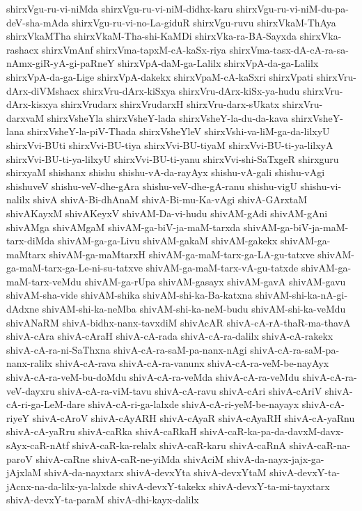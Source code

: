 {shirxVgu-ru-vi-niMda
shirxVgu-ru-vi-niM-didhx-karu
shirxVgu-ru-vi-niM-du-pa-deV-sha-mAda
shirxVgu-ru-vi-no-La-giduR
shirxVgu-ruvu
shirxVkaM-ThAya
shirxVkaMTha
shirxVkaM-Tha-shi-KaMDi
shirxVka-ra-BA-Sayxda
shirxVka-rashacx
shirxVmAnf
shirxVma-tapxM-cA-kaSx-riya
shirxVma-tasx-dA-cA-ra-sa-nAmx-giR-yA-gi-paRneY
shirxVpA-daM-ga-Lalilx
shirxVpA-da-ga-Lalilx
shirxVpA-da-ga-Lige
shirxVpA-dakekx
shirxVpaM-cA-kaSxri
shirxVpati
shirxVru-dArx-diVMshacx
shirxVru-dArx-kiSxya
shirxVru-dArx-kiSx-ya-hudu
shirxVru-dArx-kisxya
shirxVrudarx
shirxVrudarxH
shirxVru-darx-sUkatx
shirxVru-darxvaM
shirxVsheYla
shirxVsheY-lada
shirxVsheY-la-du-da-kava
shirxVsheY-lana
shirxVsheY-la-piV-Thada
shirxVsheYleV
shirxVshi-va-liM-ga-da-lilxyU
shirxVvi-BUti
shirxVvi-BU-tiya
shirxVvi-BU-tiyaM
shirxVvi-BU-ti-ya-lilxyA
shirxVvi-BU-ti-ya-lilxyU
shirxVvi-BU-ti-yanu
shirxVvi-shi-SaTxgeR
shirxguru
shirxyaM
shishanx
shishu
shishu-vA-da-rayAyx
shishu-vA-gali
shishu-vAgi
shishuveV
shishu-veV-dhe-gAra
shishu-veV-dhe-gA-ranu
shishu-vigU
shishu-vi-nalilx
shivA
shivA-Bi-dhAnaM
shivA-Bi-mu-Ka-vAgi
shivA-GArxtaM
shivAKayxM
shivAKeyxV
shivAM-Da-vi-hudu
shivAM-gAdi
shivAM-gAni
shivAMga
shivAMgaM
shivAM-ga-biV-ja-maM-tarxda
shivAM-ga-biV-ja-maM-tarx-diMda
shivAM-ga-ga-Livu
shivAM-gakaM
shivAM-gakekx
shivAM-ga-maMtarx
shivAM-ga-maMtarxH
shivAM-ga-maM-tarx-ga-LA-gu-tatxve
shivAM-ga-maM-tarx-ga-Le-ni-su-tatxve
shivAM-ga-maM-tarx-vA-gu-tatxde
shivAM-ga-maM-tarx-veMdu
shivAM-ga-rUpa
shivAM-gasayx
shivAM-gavA
shivAM-gavu
shivAM-sha-vide
shivAM-shika
shivAM-shi-ka-Ba-katxna
shivAM-shi-ka-nA-gi-dAdxne
shivAM-shi-ka-neMba
shivAM-shi-ka-neM-budu
shivAM-shi-ka-veMdu
shivANaRM
shivA-bidhx-nanx-tavxdiM
shivAcAR
shivA-cA-rA-thaR-ma-thavA
shivA-cAra
shivA-cAraH
shivA-cA-rada
shivA-cA-ra-dalilx
shivA-cA-rakekx
shivA-cA-ra-ni-SaThxna
shivA-cA-ra-saM-pa-nanx-nAgi
shivA-cA-ra-saM-pa-nanx-ralilx
shivA-cA-rava
shivA-cA-ra-vanunx
shivA-cA-ra-veM-be-nayAyx
shivA-cA-ra-veM-bu-doMdu
shivA-cA-ra-veMda
shivA-cA-ra-veMdu
shivA-cA-ra-veV-dayxru
shivA-cA-ra-viM-tavu
shivA-cA-ravu
shivA-cAri
shivA-cAriV
shivA-cA-ri-ga-LeM-dare
shivA-cA-ri-ga-lalxde
shivA-cA-ri-yeM-be-nayayx
shivA-cA-riyeY
shivA-cAroV
shivA-cAyARH
shivA-cAyaR
shivA-cAyaRH
shivA-cA-yaRnu
shivA-cA-yaRru
shivA-caRka
shivA-caRkaH
shivA-caR-ka-pa-da-davxM-davx-sAyx-caR-nAtf
shivA-caR-ka-relalx
shivA-caR-karu
shivA-caRnA
shivA-caR-na-paroV
shivA-caRne
shivA-caR-ne-yiMda
shivAciM
shivA-da-nayx-jajx-ga-jAjxlaM
shivA-da-nayxtarx
shivA-devxYta
shivA-devxYtaM
shivA-devxY-ta-jAcnx-na-da-lilx-ya-lalxde
shivA-devxY-takekx
shivA-devxY-ta-mi-tayxtarx
shivA-devxY-ta-paraM
shivA-dhi-kayx-dalilx
}
